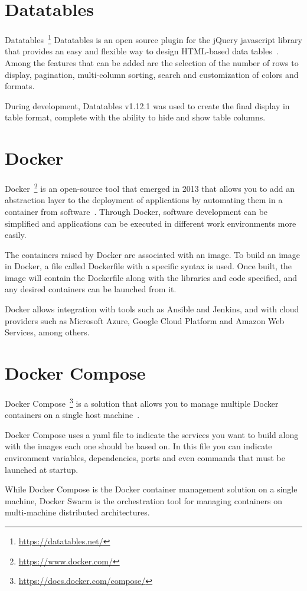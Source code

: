 \section{Datatables}

\nonzeroparskip Datatables~\footnote{\url{https://datatables.net/}} Datatables is an open source plugin for the jQuery javascript library that provides an easy and flexible way to design HTML-based data tables~\cite{datatables}. Among the features that can be added are the selection of the number of rows to display, pagination, multi-column sorting, search and customization of colors and formats.

\nonzeroparskip During development, Datatables v1.12.1 was used to create the final display in table format, complete with the ability to hide and show table columns.

\section{Docker}

\nonzeroparskip Docker~\footnote{\url{https://www.docker.com/}} is an open-source tool that emerged in 2013 that allows you to add an abstraction layer to the deployment of applications by automating them in a container from software~\cite{docker}. Through Docker, software development can be simplified and applications can be executed in different work environments more easily.

\nonzeroparskip The containers raised by Docker are associated with an image. To build an image in Docker, a file called Dockerfile with a specific syntax is used. Once built, the image will contain the Dockerfile along with the libraries and code specified, and any desired containers can be launched from it.

\nonzeroparskip Docker allows integration with tools such as Ansible and Jenkins, and with cloud providers such as Microsoft Azure, Google Cloud Platform and Amazon Web Services, among others.

\section{Docker Compose}

\nonzeroparskip Docker Compose~\footnote{\url{https://docs.docker.com/compose/}} is a solution that allows you to manage multiple Docker containers on a single host machine~\cite{docker_compose}.

\nonzeroparskip Docker Compose uses a yaml file to indicate the services you want to build along with the images each one should be based on. In this file you can indicate environment variables, dependencies, ports and even commands that must be launched at startup.

\nonzeroparskip While Docker Compose is the Docker container management solution on a single machine, Docker Swarm is the orchestration tool for managing containers on multi-machine distributed architectures.
